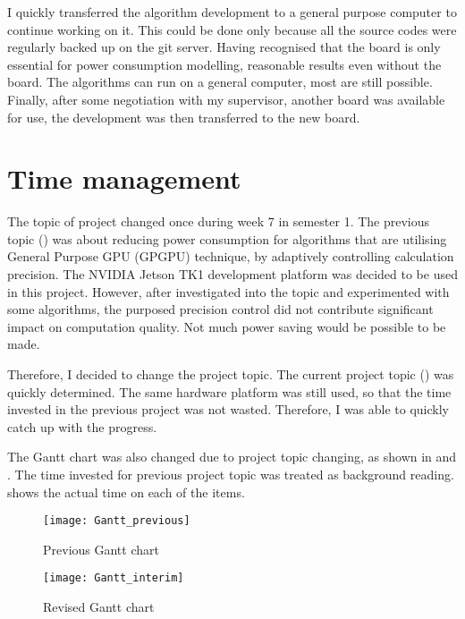 I quickly transferred the algorithm development to a general purpose computer to continue working on it. This could be done only because all the source codes were regularly backed up on the git server. Having recognised that the board is only essential for power consumption modelling, reasonable results  even without the board. The algorithms can run on a general computer, most  are still possible. Finally, after some negotiation with my supervisor, another board was available for use, the development was then transferred to the new board.

\section{Time management}

The topic of project changed once during week 7 in semester 1. The previous topic () was about reducing power consumption for algorithms that are utilising General Purpose GPU (GPGPU) technique, by adaptively controlling calculation precision. The NVIDIA Jetson TK1 development platform was decided to be used in this project. However, after investigated into the topic and experimented with some algorithms, the purposed precision control did not contribute significant impact on computation quality. Not much power saving would be possible to be made.

Therefore, I decided to change the project topic. The current project topic () was quickly determined. The same hardware platform was still used, so that the time invested in the previous project was not wasted. Therefore, I was able to quickly catch up with the progress.

The Gantt chart was also changed due to project topic changing, as shown in  and . The time invested for previous project topic was treated as background reading.  shows the actual time  on each of the items.

\begin{figure}[H]
  \centering
  \texttt{[image: Gantt\_previous]}
  \caption{Previous Gantt chart}
  \label{gantt_prev}
\end{figure}

\begin{figure}[H]
  \centering
  \texttt{[image: Gantt\_interim]}
  \caption{Revised Gantt chart}
  \label{gantt_rev}
\end{figure}

